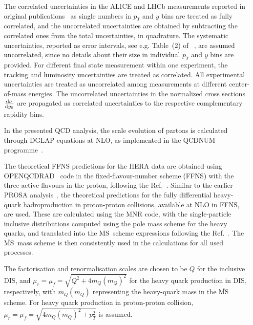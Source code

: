 \documentclass[12pt]{article}
\newcommand{\msbar}{$\overline{\text{MS}}\, $\xspace}
\begin{document}
The correlated uncertainties in the ALICE and LHCb measurements reported in original publications~\cite{Aaij:2016jht, Aaij:2013mga, Aaij:2015bpa, Acharya:2019mgn, Acharya:2017jgo, Aaij:2013noa} as single numbers in $p_T$ and $y$ bins 
are treated as fully correlated, and the uncorrelated uncertainties are obtained by subtracting the correlated ones from the 
total uncertainties, in quadrature. The systematic uncertainties, reported as error intervals, see e.g. Table~(2) of ~\cite{Aaij:2016jht}, are assumed uncorrelated, since no details about their size in individual $p_T$ and $y$ bins are provided. For different final state measurement within one experiment, the tracking and luminosity uncertainties are treated as correlated. All experimental uncertainties are treated as uncorrelated among measurements at different center-of-mass energies. 
The uncorrelated uncertainties in the normalized cross sections $\frac{{\rm d}\sigma}{{\rm d}y_0}$ are propagated as correlated uncertainties to the respective complementary rapidity bins.

In the presented QCD analysis, the scale evolution of partons is calculated through DGLAP equations at NLO, as implemented in 
the QCDNUM programme~\cite{openqcdrad}.  

The theoretical FFNS predictions for the HERA data are obtained using OPENQCDRAD~\cite{openqcdrad} code in the 
fixed-flavour-number scheme (FFNS) with the three active flavours in the proton, following the Ref.~\cite{H1:2018flt}. 
Similar to the earlier PROSA analysis~\cite{Zenaiev:2015rfa}, the theoretical predictions for the fully differential 
heavy-quark hadroproduction in proton-proton collisions, available at NLO in FFNS, are used. These are calculated using 
the MNR code, with the single-particle inclusive distributions computed using the pole mass scheme for the heavy quarks, 
and translated into the \msbar scheme expressions following the Ref.~\cite{Dowling:2013baa}. The \msbar mass scheme is 
then consistently used in the calculations for all used processes.

The factorisation and renormalisation scales are chosen to be $Q$ for the inclusive DIS, and $\mu_r = \mu_f = \sqrt{Q^2 + 4m_Q(m_Q)^2}$ for the heavy quark production in DIS, respectively, with $m_Q(m_Q)$ representing the heavy-quark mass in the \msbar scheme. 
For heavy quark production in proton-proton collision, $\mu_r = \mu_f = \sqrt{4m_Q(m_Q)^2+p_T^2}$ is assumed. 
\end{document}
